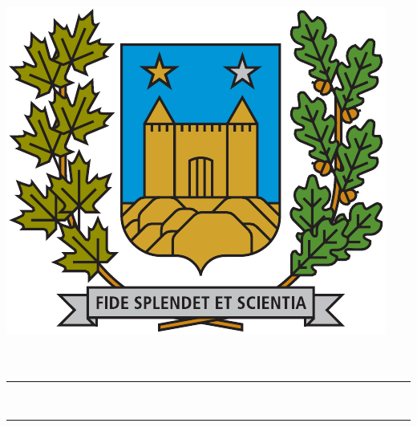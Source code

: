 \begin{titlepage}
    \centering
    \includegraphics[scale = 1.2]{images/logo.pdf}\\[0.25cm]
    \Huge{\Faculty}\\[1.0 cm]
    \LARGE{\Course}\\
    \rule{\linewidth}{0.2 mm}\\[0.3cm]
    \LARGE{\Subject}
    \rule{\linewidth}{0.2 mm}\\[1.5 cm]
	\begin{minipage}{0.8 \textwidth}
            \centering
            \Large
            \projectName \dotfill \project\\[0.5 cm]
	    \Prof \dotfill \ProfName\\[0.5 cm]
	    \Author \dotfill \AuthorsName\\[0.5 cm]
	    \StdNo \dotfill \YourStdNo\\[0.5 cm]
	    \Date \dotfill \RealesedDate\\[0.5 cm]
	\end{minipage}
\end{titlepage}